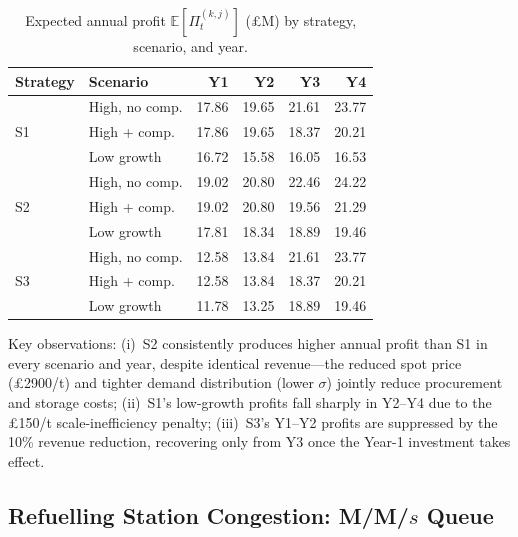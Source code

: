 \documentclass[10pt,a4paper]{article}
\newcommand{\E}{\mathbb{E}}
\begin{document}
\begin{table}[H]
    \centering
    \caption{Expected annual profit $\E[\Pi_t^{(k,j)}]$ (£M) by strategy, scenario, and year.}
    \label{tab:nv_annual}
    \small
    \begin{tabular}{@{}llrrrr@{}}
        \toprule
        \textbf{Strategy} & \textbf{Scenario} & \textbf{Y1} & \textbf{Y2} & \textbf{Y3} & \textbf{Y4} \\
        \midrule
        \multirow{3}{*}{S1}
                          & High, no comp.    & 17.86       & 19.65       & 21.61       & 23.77       \\
                          & High + comp.      & 17.86       & 19.65       & 18.37       & 20.21       \\
                          & Low growth        & 16.72       & 15.58       & 16.05       & 16.53       \\
        \midrule
        \multirow{3}{*}{S2}
                          & High, no comp.    & 19.02       & 20.80       & 22.46       & 24.22       \\
                          & High + comp.      & 19.02       & 20.80       & 19.56       & 21.29       \\
                          & Low growth        & 17.81       & 18.34       & 18.89       & 19.46       \\
        \midrule
        \multirow{3}{*}{S3}
                          & High, no comp.    & 12.58       & 13.84       & 21.61       & 23.77       \\
                          & High + comp.      & 12.58       & 13.84       & 18.37       & 20.21       \\
                          & Low growth        & 11.78       & 13.25       & 18.89       & 19.46       \\
        \bottomrule
    \end{tabular}
\end{table}

Key observations: (i)~S2 consistently produces higher annual profit than S1 in every scenario and year, despite identical revenue---the reduced spot price (\pounds2900/t) and tighter demand distribution (lower $\sigma$) jointly reduce procurement and storage costs; (ii)~S1's low-growth profits fall sharply in Y2--Y4 due to the \pounds150/t scale-inefficiency penalty; (iii)~S3's Y1--Y2 profits are suppressed by the 10\% revenue reduction, recovering only from Y3 once the Year-1 investment takes effect.

\subsection{Refuelling Station Congestion: M/M/$s$ Queue}
\label{sec:queueing}
\end{document}
